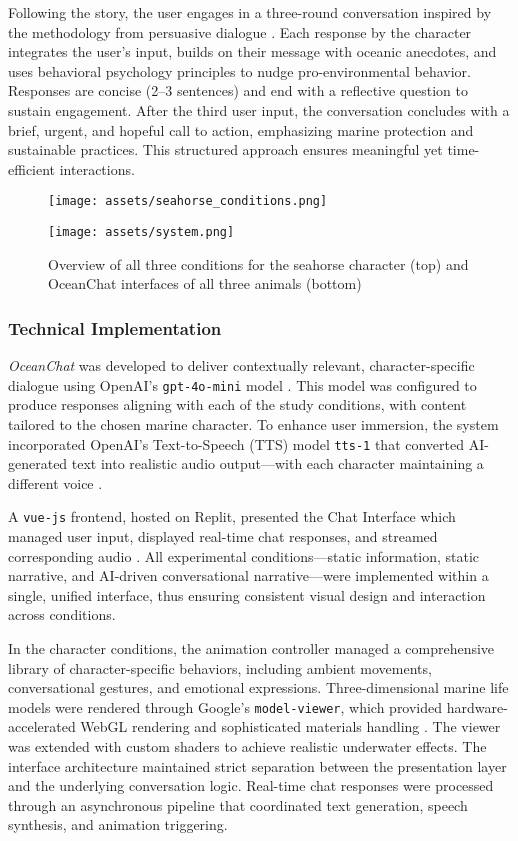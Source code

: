 \documentclass[sigconf, nonacm]{acmart}
\begin{document}
Following the story, the user engages in a three-round conversation inspired by the methodology from \citeauthor{Costello2024} persuasive dialogue \cite{Costello2024}. Each response by the character integrates the user’s input, builds on their message with oceanic anecdotes, and uses behavioral psychology principles to nudge pro-environmental behavior. Responses are concise (2–3 sentences) and end with a reflective question to sustain engagement. After the third user input, the conversation concludes with a brief, urgent, and hopeful call to action, emphasizing marine protection and sustainable practices. This structured approach ensures meaningful yet time-efficient interactions.

\begin{figure*}[htbp]
  \centering
  \texttt{[image: assets/seahorse\_conditions.png]}
  \par\vspace{0.2cm}
  \texttt{[image: assets/system.png]}
  \caption{Overview of all three conditions for the seahorse character (top) and OceanChat interfaces of all three animals (bottom)}
  \label{fig:interfaces}
\end{figure*}

\subsubsection{Technical Implementation}

\textit{OceanChat} was developed to deliver contextually relevant, character-specific dialogue using OpenAI's \texttt{gpt-4o-mini} model \cite{openai2025}. This model was configured to produce responses aligning with each of the study conditions, with content tailored to the chosen marine character. To enhance user immersion, the system incorporated OpenAI's Text-to-Speech (TTS) model \texttt{tts-1} that converted AI-generated text into realistic audio output—with each character maintaining a different voice \cite{openai2025}. 

A \texttt{vue-js} frontend, hosted on Replit, presented the Chat Interface which managed user input, displayed real-time chat responses, and streamed corresponding audio \cite{replit, vuejs}. All experimental conditions—static information, static narrative, and AI-driven conversational narrative—were implemented within a single, unified interface, thus ensuring consistent visual design and interaction across conditions.


In the character conditions, the animation controller managed a comprehensive library of character-specific behaviors, including ambient movements, conversational gestures, and emotional expressions. Three-dimensional marine life models were rendered through Google's \texttt{model-viewer}, which provided hardware-accelerated WebGL rendering and sophisticated materials handling \cite{google2025}. The viewer was extended with custom shaders to achieve realistic underwater effects. The interface architecture maintained strict separation between the presentation layer and the underlying conversation logic. Real-time chat responses were processed through an asynchronous pipeline that coordinated text generation, speech synthesis, and animation triggering. 
\end{document}
